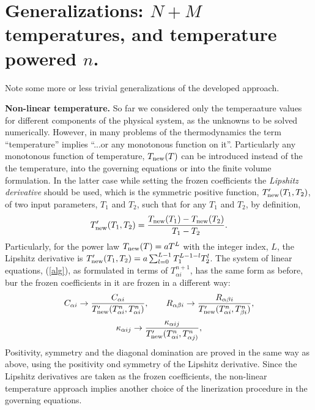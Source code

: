 \documentclass[12pt]{revtex4}
\begin{document}
\section{Generalizations: $N+M$ temperatures, and temperature powered $n$.}
Note some more or less trivial generalizations of the developed approach. 

{\bf Non-linear temperature.} So far we considered only the temperaature values for different components of the physical system, as the unknowns to be solved 
numerically. However, in many problems of the thermodynamics the term ``temperature'' implies ``...or any monotonous function on it''. Particularly any 
monotonous function of temperature, $T_{\rm new}(T)$ can be introduced instead of the the temperature, into the governing equations or into the finite volume 
formulation. In the latter 
case while setting the frozen coefficients the {\it Lipshitz derivative} should be used, which is the symmetric positive function, $T_{\rm new}^\prime(T_1,T_2)$, of two 
input parameters, $T_1$ and $T_2$, such that for any $T_1$ and $T_2$, by definition,
\begin{equation}
T^\prime_{\rm new}(T_1,T_2)=\frac{T_{\rm new}(T_1)-T_{\rm new}(T_2)}{T_1-T_2}.
\end{equation}   
Particularly, for the power law $T_{\rm new}(T)=aT^L$ with the integer index, $L$, the Lipshitz derivative is 
$T_{\rm new}^\prime(T_1,T_2)=a\sum_{l=0}^{L-1}{T^{L-1-l}_1T_2^l}$. The system of linear equations, (\ref{alg}), as formulated in terms of $T^{n+1}_{\alpha i}$, has the 
same form as before, bur the frozen coefficients in it are frozen in a different way:
\begin{equation}
C_{\alpha i}\rightarrow \frac{C_{\alpha i}}
{T^\prime_{\rm new}(T^n_{\alpha i},T^n_{\alpha i})},\qquad
R_{\alpha\beta i}\rightarrow \frac{R_{\alpha\beta i}}
{T^\prime_{\rm new}(T^n_{\alpha i},T^n_{\beta i})},
\end{equation} 
\begin{equation}
\kappa_{\alpha ij}\rightarrow \frac{\kappa_{\alpha ij}}
{T^\prime_{\rm new}(T^n_{\alpha i},T^n_{\alpha j)}},
\end{equation}
Positivity, symmetry and the diagonal domination are proved in the same way as above, using the positivity ond symmetry of the Lipshitz derivative. Since the
Lipshitz derivatives are taken as the frozen coefficients, the non-linear temperature approach implies another choice of the linerization procedure in the 
governing equations. 
\end{document}
